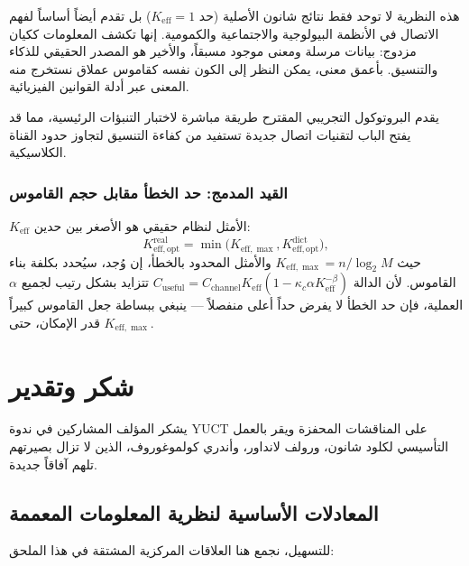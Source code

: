 \documentclass[12pt,a4paper]{article}
\newcommand{\Keff}{K_{\mathrm{eff}}}
\newcommand{\Keffopt}{K_{\mathrm{eff},\mathrm{opt}}}
\newcommand{\Keffmax}{K_{\mathrm{eff},\max}}
\theoremstyle{remark}
\begin{document}
	هذه النظرية لا توحد فقط نتائج شانون الأصلية (حد \(\Keff=1\)) بل تقدم أيضاً أساساً لفهم الاتصال في الأنظمة البيولوجية والاجتماعية والكمومية. إنها تكشف المعلومات ككيان مزدوج: بيانات مرسلة ومعنى موجود مسبقاً، والأخير هو المصدر الحقيقي للذكاء والتنسيق. بأعمق معنى، يمكن النظر إلى الكون نفسه كقاموس عملاق نستخرج منه المعنى عبر أدلة القوانين الفيزيائية.
	
	يقدم البروتوكول التجريبي المقترح طريقة مباشرة لاختبار التنبؤات الرئيسية، مما قد يفتح الباب لتقنيات اتصال جديدة تستفيد من كفاءة التنسيق لتجاوز حدود القناة الكلاسيكية.
	
	\subsubsection{القيد المدمج: حد الخطأ مقابل حجم القاموس}
	\(\Keff\) الأمثل لنظام حقيقي هو الأصغر بين حدين:
	\[
	\Keffopt^{\text{real}} = \min\bigl( \Keffmax, \Keffopt^{\text{dict}} \bigr),
	\]
	حيث \(\Keffmax = n / \log_2 M\) والأمثل المحدود بالخطأ، إن وُجد، سيُحدد بكلفة بناء القاموس. لأن الدالة \(C_{\text{useful}} = C_{\text{channel}} \Keff (1 - \kappa_c\alpha K_{\mathrm{eff}}^{-\beta})\) تتزايد بشكل رتيب لجميع \(\alpha\) العملية، فإن حد الخطأ لا يفرض حداً أعلى منفصلاً — ينبغي ببساطة جعل القاموس كبيراً قدر الإمكان، حتى \(\Keffmax\).
	
	\section*{شكر وتقدير}
	
	يشكر المؤلف المشاركين في ندوة YUCT على المناقشات المحفزة ويقر بالعمل التأسيسي لكلود شانون، ورولف لانداور، وأندري كولموغوروف، الذين لا تزال بصيرتهم تلهم آفاقاً جديدة.
	
	\subsection*{المعادلات الأساسية لنظرية المعلومات المعممة}
	للتسهيل، نجمع هنا العلاقات المركزية المشتقة في هذا الملحق:
	
\end{document}

